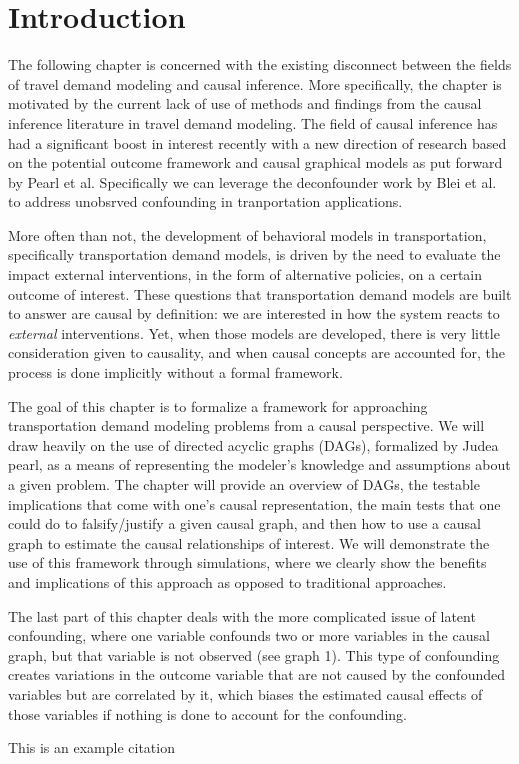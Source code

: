 \section{Introduction}
The following chapter is concerned with the existing disconnect between the 
fields of travel demand modeling and causal inference. More specifically, the 
chapter is motivated by the current lack of use of methods and findings from 
the causal inference literature in travel demand modeling. The field of causal 
inference has had a significant boost in interest recently with a new 
direction of research based on the potential outcome framework and causal 
graphical models as put forward by Pearl et al. Specifically we can leverage 
the deconfounder work by Blei et al. to address unobsrved confounding in 
tranportation applications.




More often than not, the development of behavioral models in transportation, 
specifically transportation demand models, is driven by the need to evaluate 
the impact external interventions, in the form of alternative policies, on a 
certain outcome of interest. These questions that transportation demand models 
are built to answer are causal by definition: we are interested in how the 
system reacts to \textit{external} interventions. Yet, when those models are 
developed, there is very little consideration given to causality, and when 
causal concepts are accounted for, the process is done implicitly without a 
formal framework. 


The goal of this chapter is to formalize a framework for approaching 
transportation demand modeling problems from a causal perspective. We will 
draw heavily on the use of directed acyclic graphs (DAGs), formalized by Judea 
pearl, as a means of representing the modeler's knowledge and assumptions 
about a given problem. The chapter will provide an overview of DAGs, the 
testable implications that come with one's causal representation, the main 
tests that one could do to falsify/justify a given causal graph, and then how 
to use a causal graph to estimate the causal relationships of interest. We 
will demonstrate the use of this framework through simulations, where we 
clearly show the benefits and implications of this approach as opposed to 
traditional approaches. 


The last part of this chapter deals with the more complicated issue of latent 
confounding, where one variable confounds two or more variables in the causal 
graph, but that variable is not observed (see graph 1). This type of 
confounding creates variations in the outcome variable that are not caused by 
the confounded variables but are correlated by it, which biases the estimated 
causal effects of those variables if nothing is done to account for the 
confounding. 





\blindtext[2]

This is an example citation \cite{brathwaite_2018_causal}
